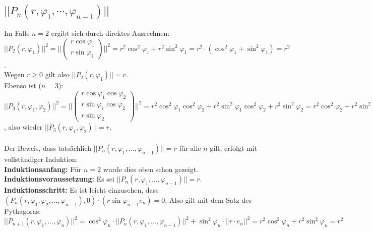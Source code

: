 \documentclass[a4paper,11pt]{scrartcl}
\begin{document}
\subsection{$||P_n(r,\varphi_1,\cdots,\varphi_{n-1})||$}
Im Falle $n=2$ ergibt sich durch direktes Ausrechnen:\\
$||P_2(r,\varphi_1)||^2=||\begin{pmatrix}r\cos\varphi_1\\ r\sin\varphi_1\end{pmatrix}||^2=
r^2\cos^2\varphi_1+r^2\sin^2\varphi_1=r^2\cdot(\cos^2\varphi_1+\sin^2\varphi_1)=r^2$.\\
Wegen $r\geq 0$ gilt also $||P_2(r,\varphi_1)||=r$.\\
Ebenso ist ($n=3$): $||P_3(r,\varphi_1,\varphi_2)||^2=
||\begin{pmatrix}r\cos\varphi_1\cos\varphi_2\\ r\sin\varphi_1\cos\varphi_2\\ r\sin\varphi_2\end{pmatrix}||^2=
r^2\cos^2\varphi_1\cos^2\varphi_2+r^2\sin^2\varphi_1\cos^2\varphi_2+r^2\sin^2\varphi_2
=r^2\cos^2\varphi_2+r^2\sin^2\varphi_2=r^2$, also wieder $||P_3(r,\varphi_1,\varphi_2)||=r$.\\ \\
Der Beweis, dass tatsächlich $||P_n(r,\varphi_1,\ldots,\varphi_{n-1})||=r$ für alle $n$ gilt, erfolgt mit vollständiger Induktion:\\
\textbf{Induktionsanfang:} Für $n=2$ wurde dies oben schon gezeigt. \checkmark\\
\textbf{Induktionsvoraussetzung:} Es sei $||P_n(r,\varphi_1,\ldots,\varphi_{n-1})||=r$.\\
\textbf{Induktionsschritt:} Es ist leicht einzusehen, dass $(P_n(r,\varphi_1, \varphi_2, \ldots, \varphi_{n-1}), 0)\cdot (r\sin\varphi_{n-1}e_n) = 0$. 
Also gilt mit dem Satz des Pythagoras:\\
$||P_{n+1}(r,\varphi_1,\ldots,\varphi_n)||^2=\cos^2\varphi_n\cdot||P_n(r,\varphi_1,\ldots,\varphi_{n-1})||^2 +\sin^2\varphi_n\cdot||r\cdot e_n||^2=r^2\cos^2\varphi_n+r^2\sin^2\varphi_n=r^2$ \checkmark
\end{document}
